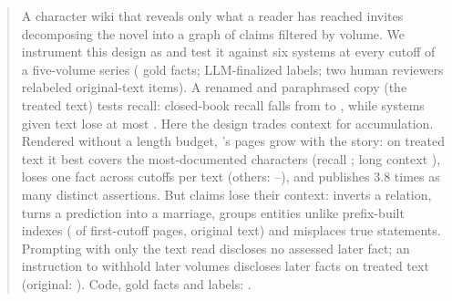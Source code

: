 \begin{abstract}
A character wiki that reveals only what a reader has reached invites decomposing the novel
into a graph of claims filtered by volume. We instrument this design as \sys and test it
against six systems at every cutoff of a five-volume series
( gold facts; LLM-finalized labels\ifnwhuman{}; two human reviewers
relabeled  original-text items\fi{}). A renamed and paraphrased copy (the
treated text) tests recall: closed-book recall falls
from  to , while systems given text lose
at most . Here the design trades context for
accumulation. Rendered without a length budget, \sys's pages grow with the story: on
treated text it best covers the most-documented characters
(recall ; long context ), loses one fact
across cutoffs per text (others: --), and
publishes 3.8 times as many distinct assertions. But claims lose their context: \sys
inverts a relation, turns a prediction into a marriage, groups entities unlike
prefix-built indexes ( of first-cutoff pages, original text) and
misplaces true statements. Prompting with only the text read discloses no assessed later
fact; an instruction to withhold later volumes
discloses  later facts on treated text (original:
). Code, gold facts and labels: \anonrepo.
\end{abstract}
